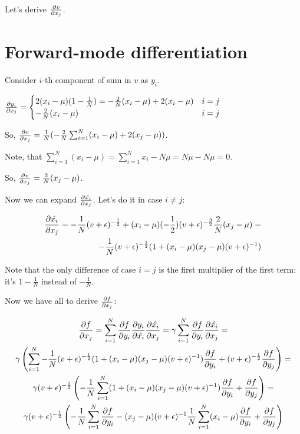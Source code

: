 \documentclass[12pt]{article}
\begin{document}
Let's derive $\pdv{v}{x_j}$.

\section{Forward-mode differentiation}

Consider $i$-th component of sum in $v$ as $y_i$.

$
\pdv{y_i}{x_j} = 
\begin{cases}
2 (x_i - \mu) (1 - \frac{1}{N}) = -\frac{2}{N} (x_i - \mu) + 2(x_i - \mu) & \text{$i = j$} \\
-\frac{2}{N} (x_i - \mu) & \text{$i = j$}
\end{cases}
$ 

So, $\pdv{v}{x_j} = \frac{1}{N} ( -\frac{2}{N} \sum_{i=1}^{N}(x_i - \mu) + 2(x_j - \mu))$.

Note, that $\sum_{i=1}^{N}(x_i - \mu) = \sum_{i=1}^{N} x_i - N \mu = N \mu - N \mu = 0$.

So, $\pdv{v}{x_j} = \frac{2}{N} (x_j - \mu)$.

Now we can expand $\pdv{\hat{x_i}}{x_j}$. Let's do it in case $i \ne j$:

\begin{gather*}
\begin{split}
\pdv{\hat{x_i}}{x_j} =
-\frac{1}{N} (v + \epsilon)^{-\frac{1}{2}} + (x_i - \mu) (-\frac{1}{2}) (v + \epsilon)^{-\frac{3}{2}} \frac{2}{N}(x_j - \mu) = \\
-\frac{1}{N} (v + \epsilon)^{-\frac{1}{2}} (1 + (x_i - \mu) (x_j - \mu) (v + \epsilon)^{-1})
\end{split}
\end{gather*}

Note that the only difference of case $i = j$ is the first multiplier of the first term: it's $1 - \frac{1}{N}$ instead of $-\frac{1}{N}$.

Now we have all to derive $\pdv{f}{x_j}$:

\begin{gather*}
\pdv{f}{x_j} = 
\sum_{i=1}^{N} \pdv{f}{y_i} \pdv{y_i}{\hat{x_i}} \pdv{\hat{x_i}}{x_j} = 
\gamma \sum_{i=1}^{N} \pdv{f}{y_i} \pdv{\hat{x_i}}{x_j} = \\
\gamma \left( \sum_{i=1}^{N} -\frac{1}{N} (v + \epsilon)^{-\frac{1}{2}} (1 + (x_i - \mu) (x_j - \mu) (v + \epsilon)^{-1}) \pdv{f}{y_i} + (v + \epsilon)^{-\frac{1}{2}} \pdv{f}{y_j} \right) = \\
\gamma (v + \epsilon)^{-\frac{1}{2}} \left( -\frac{1}{N} \sum_{i=1}^{N} (1 + (x_i - \mu) (x_j - \mu) (v + \epsilon)^{-1}) \pdv{f}{y_i} + \pdv{f}{y_j} \right) = \\
\gamma (v + \epsilon)^{-\frac{1}{2}} \left( -\frac{1}{N} \sum_{i=1}^{N} \pdv{f}{y_i} - (x_j - \mu) (v + \epsilon)^{-1} \frac{1}{N} \sum_{i=1}^{N} (x_i - \mu) \pdv{f}{y_i} + \pdv{f}{y_j} \right)
\end{gather*}
\end{document}
